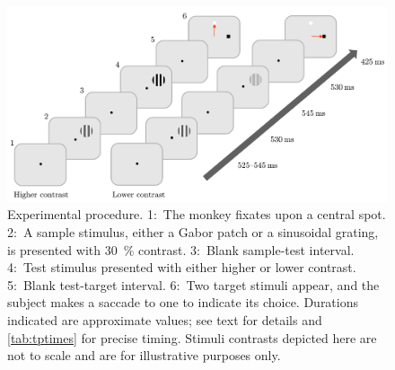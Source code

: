 \begin{figure}[tbhp]
\begin{center}
\includegraphics[width=\linewidth]{figs/task/PLtask1.pdf}
\end{center}
\caption{
Experimental procedure.
1:~The monkey fixates upon a central spot.
2:~A sample stimulus, either a Gabor patch or a sinusoidal grating, is presented with \SI{30}{\percent} contrast.
3:~Blank sample-test interval.
4:~Test stimulus presented with either higher or lower contrast.
5:~Blank test-target interval.
6:~Two target stimuli appear, and the subject makes a saccade to one to indicate its choice.
Durations indicated are approximate values; see text for details and \autoref{tab:tptimes} for precise timing.
Stimuli contrasts depicted here are not to scale and are for illustrative purposes only.
}
\label{fig:pltask1}
\end{figure}



